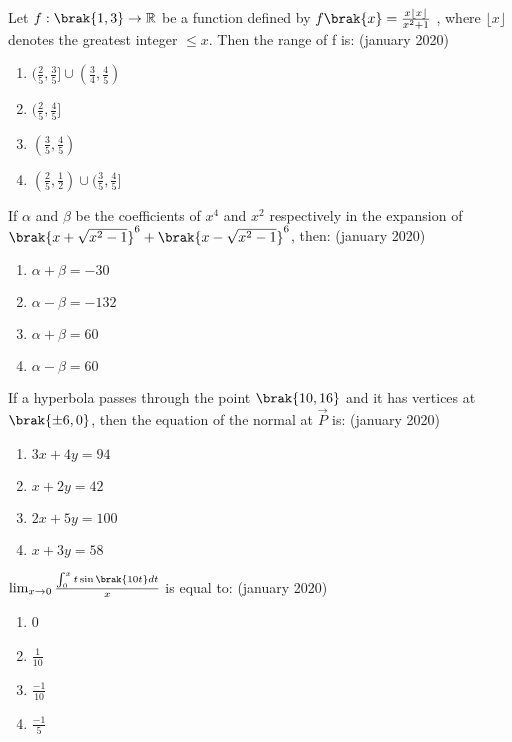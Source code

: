     \item Let $f : \brak{1,3} \rightarrow \mathbb{R}$ be a function defined by $f\brak{x} = \frac{x\lfloor x \rfloor}{x^2+1}$ , where $\lfloor x \rfloor$ denotes the greatest integer $\leq x$. Then the range of f is:
	    \hfill{(january 2020)}
	    \begin{enumerate}
        \item $( \frac{2}{5} , \frac{3}{5} ] \cup ( \frac{3}{4} , \frac{4}{5} )$
        \item $( \frac{2}{5} , \frac{4}{5} ]$
        \item $( \frac{3}{5} , \frac{4}{5} )$
        \item $( \frac{2}{5} , \frac{1}{2} ) \cup ( \frac{3}{5} , \frac{4}{5} ]$
    \end{enumerate}
    \item If $\alpha$ and $\beta$ be the coefficients of $x^4$  and $x^2$ respectively in the expansion of $\brak{x+\sqrt{x^2-1}}^6 + \brak{x-\sqrt{x^2-1}}^6$, then:
    \hfill{(january 2020)}
	    \begin{enumerate}
        \item $\alpha + \beta = -30 $
        \item $\alpha - \beta = -132$
       \item $\alpha + \beta = 60 $
        \item $\alpha - \beta = 60$
    \end{enumerate}
    \item  If a hyperbola passes through the point $\brak{10, 16}$ and it has vertices at $\brak{\pm 6, 0}$, then the equation of the normal at $\vec{P}$ is:
    \hfill{(january 2020)}
		\begin{enumerate}
        \item $3x+4y=94$
        \item $x+2y=42$
        \item $2x+5y=100$
        \item $x+3y=58$
    \end{enumerate}
    \item $\lim_{x \to 0} \frac{\int^{x}_0 t\sin\brak{10t}dt}{x}$ is equal to:
	    \hfill{(january 2020)}
    \begin{enumerate}
        \item 0
        \item $\frac{1}{10}$
        \item $\frac{-1}{10}$
        \item $\frac{-1}{5}$
    \end{enumerate}

